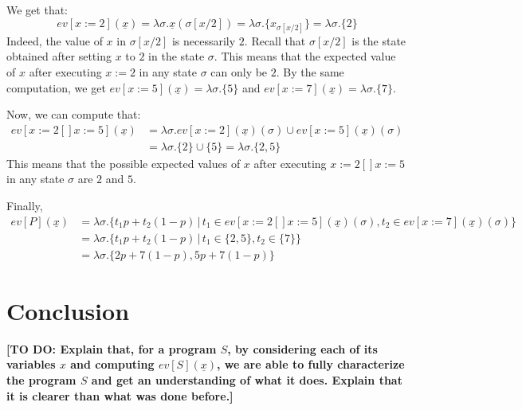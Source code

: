 \documentclass[a4paper,10pt]{llncs}
\newcommand\todo[1]{{\color{red}\textbf{[TO DO:  #1]}}}
\begin{document}
We get that:
$$ev[x := 2](\underline{x}) = \lambda\sigma.\underline{x}(\sigma[x/2]) = \lambda\sigma.\{x_{\sigma[x/2]}\} = \lambda\sigma.\{2\}$$ 
Indeed, the value of $x$ in $\sigma[x/2]$ is necessarily $2$. Recall that $\sigma[x/2]$ is the state obtained after setting $x$ to $2$ in the state $\sigma$. This means that the expected value of $x$ after executing $x := 2$ in any state $\sigma$ can only be $2$. By the same computation, we get $ev[x := 5](\underline{x}) = \lambda\sigma.\{5\}$ and $ev[x := 7](\underline{x}) = \lambda\sigma.\{7\}$.\newline

Now, we can compute that:
\begin{align*}
ev[x := 2 [\!] x := 5](\underline{x}) &= \lambda\sigma. ev[x := 2](\underline{x})(\sigma) \cup ev[x := 5](\underline{x})(\sigma) \\
&= \lambda\sigma. \{2\} \cup \{5\} = \lambda\sigma.\{2,5\} 
\end{align*}
This means that the possible expected values of $x$ after executing $x := 2 [\!] x := 5$ in any state $\sigma$ are $2$ and $5$.\newline

Finally, 
\begin{align*}
ev[P](\underline{x}) &= \lambda\sigma.\{t_1 p+t_2(1-p) \,|\, t_1 \in ev[x := 2 [\!] x := 5](\underline{x})(\sigma), t_2 \in ev[x := 7](\underline{x})(\sigma) \} \\
&= \lambda\sigma.\{t_1 p+t_2(1-p) \,|\, t_1 \in \{2,5\}, t_2 \in \{7\} \} \\
&= \lambda\sigma. \{2p+7(1-p),5p+7(1-p) \} 
\end{align*}



\section{Conclusion}
\todo{Explain that, for a program $S$, by considering each of its variables $x$ and computing $ev[S](\underline{x})$, we are able to fully characterize the program $S$ and get an understanding of what it does. Explain that it is clearer than what was done before.}
\label{sec:conclusion}


{}

\end{document}
